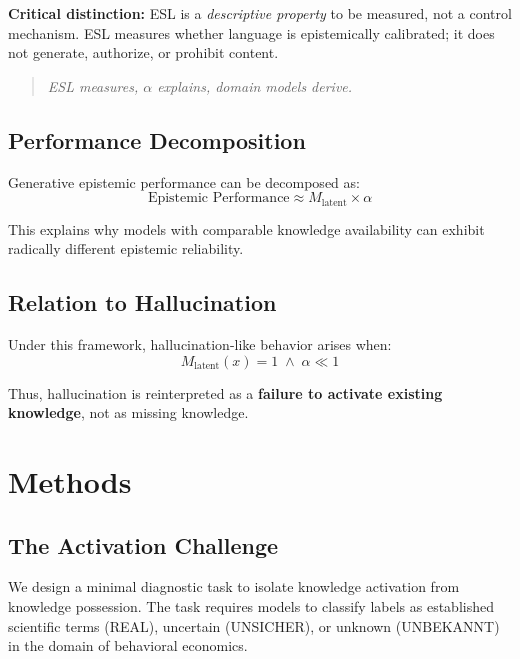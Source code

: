 \documentclass[11pt,a4paper]{article}
\begin{document}
\textbf{Critical distinction:} ESL is a \emph{descriptive property} to be measured, not a control mechanism. ESL measures whether language is epistemically calibrated; it does not generate, authorize, or prohibit content.

\begin{quote}
\emph{ESL measures, $\alpha$ explains, domain models derive.}
\end{quote}

\subsection{Performance Decomposition}

Generative epistemic performance can be decomposed as:
\begin{equation}
\text{Epistemic Performance} \approx M_{\text{latent}} \times \alpha
\end{equation}

This explains why models with comparable knowledge availability can exhibit radically different epistemic reliability.

\subsection{Relation to Hallucination}

Under this framework, hallucination-like behavior arises when:
\[
M_{\text{latent}}(x) = 1 \;\land\; \alpha \ll 1
\]

Thus, hallucination is reinterpreted as a \textbf{failure to activate existing knowledge}, not as missing knowledge.


\section{Methods}

\subsection{The Activation Challenge}

We design a minimal diagnostic task to isolate knowledge activation from knowledge possession. The task requires models to classify labels as established scientific terms (REAL), uncertain (UNSICHER), or unknown (UNBEKANNT) in the domain of behavioral economics.
\end{document}
